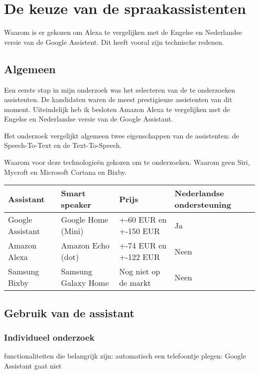\section{De keuze van de spraakassistenten}
Waarom is er gekozen om Alexa te vergelijken met de Engelse en Nederlandse versie van de Google Assistent. Dit heeft vooral zijn technische redenen. 

\subsection{Algemeen}
\label{sec:algemeen}
Een eerste stap in mijn onderzoek was het selecteren van de te onderzoeken assistenten. De kandidaten waren de meest prestigieuze assistenten van dit moment. Uiteindelijk heb ik besloten Amazon Alexa te vergelijken met de Engelse en Nederlandse versie van de Google Assistant.

Het onderzoek vergelijkt algemeen twee eigenschappen van de assistenten: de Speech-To-Text en de Text-To-Speech. 

Waarom voor deze technologieën gekozen om te onderzoeken. Waarom geen Siri, Mycroft en Microsoft Cortana en Bixby.

\begin{center}
    \begin{tabular}{ | l | l | l | l |}
        \hline
        Assistant & Smart speaker & Prijs & Nederlandse ondersteuning\\ \hline
        Google Assistant & Google Home (Mini) & +-60 EUR en +-150 EUR & Ja \\ \hline
        Amazon Alexa & Amazon Echo (dot) & +-74 EUR en +-122 EUR & Neen \\ \hline
        Samsung Bixby & Samsung Galaxy Home & Nog niet op de markt & Neen\\ \hline
    \end{tabular}
\end{center}

\subsection{Gebruik van de assistant}
\label{sec:gebruik van de assistant}

\subsubsection{Individueel onderzoek}
functionaliteiten die belangrijk zijn:
automatisch een telefoontje plegen: Google Assistant gaat niet

